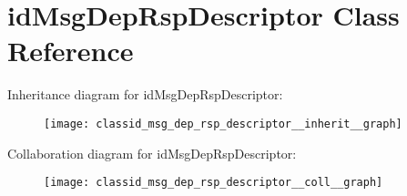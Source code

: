 \hypertarget{classid_msg_dep_rsp_descriptor}{}\section{id\+Msg\+Dep\+Rsp\+Descriptor Class Reference}
\label{classid_msg_dep_rsp_descriptor}


Inheritance diagram for id\+Msg\+Dep\+Rsp\+Descriptor\+:\nopagebreak
\begin{figure}[H]
\begin{center}
\leavevmode
\texttt{[image: classid\_msg\_dep\_rsp\_descriptor\_\_inherit\_\_graph]}
\end{center}
\end{figure}


Collaboration diagram for id\+Msg\+Dep\+Rsp\+Descriptor\+:\nopagebreak
\begin{figure}[H]
\begin{center}
\leavevmode
\texttt{[image: classid\_msg\_dep\_rsp\_descriptor\_\_coll\_\_graph]}
\end{center}
\end{figure}
